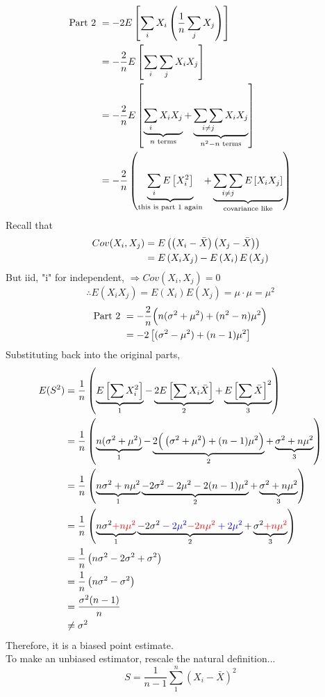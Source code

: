 \documentclass[12pt]{article}
\newcommand{\E}[1]{E\left( {#1} \right)}
\newcommand{\pars}[1]{\left( {#1} \right) }
\newcommand{\brac}[1]{\left[ {#1} \right] }
\newcommand{\xbar}{\bar{X}}
\renewcommand{\over}[1]{\frac{1}{{#1}}}
\begin{document}
\begin{align}
    \text{Part 2 } &= -2E\brac{\sum_i X_i\pars{\over{n}\sum_j X_j}}\notag\\
    &= -\frac{2}{n} E \brac{\sum_i \sum_j X_i X_j} \notag\\%
    &= -\frac{2}{n} E \brac{\underbrace{\sum_i X_iX_j}_{n \text{ terms}} + \underbrace{\mathop{\sum\sum}_{i\neq j}  X_i X_j}_{n^2-n \text{ terms}}} \notag\\
    &= -\frac{2}{n} \pars{\underbrace{\sum_i E\brac{X_i^2}}_{\text{this is part 1 again}} + \underbrace{ \mathop{\sum\sum}_{i\neq j}  E\brac{X_i X_j}}_{\text{covariance like}}}\notag
\end{align}
Recall that
\begin{align}
    Cov(X_i,X_j) &= \E{\pars{X_i - \xbar}\pars{X_j - \xbar}} \notag\\
    &= \E{X_iX_j} - \E{X_i}\E{X_j} \notag
\end{align}
But iid, "i" for independent, $\Rightarrow Cov(X_i, X_j) = 0$
$$\therefore \E{X_i X_j} = \E{X_i}\E{X_j} = \mu \cdot \mu = \mu^2$$
\begin{align}
    \text{Part 2 } &= -\frac{2}{n}\Big(n(\sigma^2 + \mu^2) + (n^2 - n)\mu^2\Big)\notag\\
    &= -2\brac{(\sigma^2-\mu^2) + (n-1)\mu^2}\notag
\end{align}
Substituting back into the original parts,
\begin{align}
    E(S^2) &= \over{n}\pars{\underbrace{E\brac{\sum X_i^2}}_1 - \underbrace{2E\brac{\sum X_i\xbar}}_2 + \underbrace{E\brac{\sum \xbar}^2}_3} \notag\\
    &= \over{n}\pars{\underbrace{n(\sigma^2+\mu^2)}_1 - \underbrace{2\Big( \pars{\sigma^2 + \mu^2} + (n-1)\mu^2 \Big) }_2 + \underbrace{\sigma^2 + n\mu^2}_3} \notag\\
    &= \over{n}\pars{\underbrace{n\sigma^2+n\mu^2}_1 \underbrace{ -2\sigma^2 -2\mu^2 -2(n-1)\mu^2}_2 + \underbrace{\sigma^2 + n\mu^2}_3} \notag\\
    &= \over{n}\pars{\underbrace{n\sigma^2\color{red}{+n\mu^2}}_1 \underbrace{ -2\sigma^2 \color{blue} -2\mu^2 \color{red}{-2n\mu^2} \color{blue} + 2\mu^2}_2 + \underbrace{\sigma^2 \color{red}{+n\mu^2}}_3} \notag\\
    &= \over{n}\pars{n\sigma^2 -2\sigma^2 + \sigma^2} \notag\\
    &= \over{n}\pars{n\sigma^2 -\sigma^2} \notag\\
    &= \frac{\sigma^2(n-1)}{n} \notag\\
    &\neq \sigma^2\notag 
\end{align}
Therefore, it is a biased point estimate.\\
To make an unbiased estimator, rescale the natural definition...
$$S = \over{n-1} \sum_1^n \pars{X_i - \xbar}^2$$
\vspace{0.3in}
\end{document}
